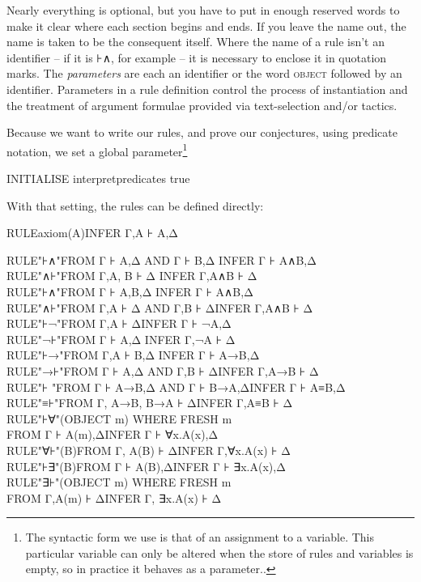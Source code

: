 \documentclass[11pt]{book}
\newcommand{\tab}{\hspace{5mm}}
\begin{document}
Nearly everything is optional, but you have to put in enough reserved words to make it clear where each section begins and ends. If you leave the name out, the name is taken to be the consequent itself. Where the name of a rule isn't an identifier -- if it is ⊦∧, for example -- it is necessary to enclose it in quotation marks. The \textit{parameters} are each an identifier or the word \textsc{object} followed by an identifier. Parameters in a rule definition control the process of instantiation and the treatment of argument formulae provided via text-selection and/or tactics.


Because we want to write our rules, and prove our conjectures, using predicate notation, we set a global parameter\footnote{The syntactic form we use is that of an assignment to a variable. This particular variable can only be altered when the store of rules and variables is empty, so in practice it behaves as a parameter..}

INITIALISE interpretpredicates true


With that setting, the rules can be defined directly:

RULE\tab axiom(A)\tab INFER Γ,A ⊦ A,Δ

RULE\tab "⊦∧"\tab FROM Γ ⊦ A,Δ AND Γ ⊦ B,Δ \tab INFER Γ ⊦ A∧B,Δ\\
RULE\tab "∧⊦"\tab FROM Γ,A, B ⊦ Δ \tab INFER Γ,A∧B ⊦ Δ\\
RULE\tab "⊦∧"\tab FROM Γ ⊦ A,B,Δ \tab INFER Γ ⊦ A∧B,Δ\\
RULE\tab "∧⊦"\tab FROM Γ,A ⊦ Δ AND Γ,B ⊦ Δ\tab INFER Γ,A∧B ⊦ Δ\\
RULE\tab "⊦¬"\tab FROM Γ,A ⊦ Δ\tab INFER Γ ⊦ ¬A,Δ\\
RULE\tab "¬⊦"\tab FROM Γ ⊦ A,Δ \tab INFER Γ,¬A ⊦ Δ\\
RULE\tab "⊦→"\tab FROM Γ,A ⊦ B,Δ \tab INFER Γ ⊦ A→B,Δ\\
RULE\tab "→⊦"\tab FROM Γ ⊦ A,Δ AND Γ,B ⊦ Δ\tab INFER Γ,A→B ⊦ Δ\\
RULE\tab "⊦	"\tab FROM Γ ⊦ A→B,Δ AND Γ ⊦ B→A,Δ\tab INFER Γ ⊦ A≡B,Δ\\
RULE\tab "≡⊦"\tab FROM Γ, A→B, B→A ⊦ Δ\tab INFER Γ,A≡B ⊦ Δ\\
RULE\tab "⊦∀"(OBJECT m) WHERE FRESH m\\
\tab \tab FROM Γ ⊦ A(m),Δ\tab INFER Γ ⊦ ∀x.A(x),Δ\\
RULE\tab "∀⊦"(B)\tab FROM Γ, A(B) ⊦ Δ\tab INFER Γ,∀x.A(x) ⊦ Δ\\
RULE\tab "⊦∃"(B)\tab FROM Γ ⊦ A(B),Δ\tab INFER Γ ⊦ ∃x.A(x),Δ\\
RULE\tab "∃⊦"(OBJECT m) WHERE FRESH m\\
\tab \tab FROM Γ,A(m) ⊦ Δ\tab INFER Γ, ∃x.A(x) ⊦ Δ
\end{document}
